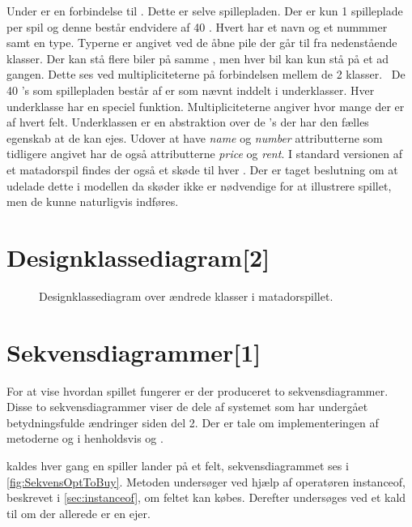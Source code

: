 Under  er en forbindelse til . Dette er selve spillepladen. Der er kun 1 spilleplade per spil og denne består endvidere af 40 . Hvert  har et navn og et nummmer samt en type. Typerne er angivet ved de åbne pile der går til  fra nedenstående klasser. Der kan stå flere biler på samme , men hver bil kan kun stå på et  ad gangen. Dette ses ved multipliciteterne på forbindelsen mellem de 2 klasser. \
De 40 's som spillepladen består af er som nævnt inddelt i underklasser. Hver underklasse har en speciel funktion. Multipliciteterne angiver hvor mange der er af hvert felt. Underklassen  er en abstraktion over de 's der har den fælles egenskab at de kan ejes. Udover at have \textit{name} og \textit{number} attributterne som tidligere angivet har de også attributterne \textit{price} og \textit{rent}. I standard versionen af et matadorspil findes der også et skøde til hver . Der er taget beslutning om at udelade dette i modellen da skøder ikke er nødvendige for at illustrere spillet, men de kunne naturligvis indføres.           

\section{Designklassediagram[2]}

\begin{figure}
\caption{Designklassediagram over ændrede klasser i matadorspillet.}\label{fig:DesignKlasseChanged}
\centering

\end{figure}

\section{Sekvensdiagrammer[1]}
For at vise hvordan spillet fungerer er der produceret to sekvensdiagrammer. Disse to sekvensdiagrammer viser de dele af systemet som har undergået betydningsfulde ændringer siden del 2. Der er tale om implementeringen af metoderne  og  i henholdsvis  og .

 kaldes hver gang en spiller lander på et felt, sekvensdiagrammet ses i \vref{fig:SekvensOptToBuy}. Metoden undersøger ved hjælp af operatøren instanceof, beskrevet i \vref{sec:instanceof}, om feltet kan købes. Derefter undersøges ved et kald til  om der allerede er en ejer.

